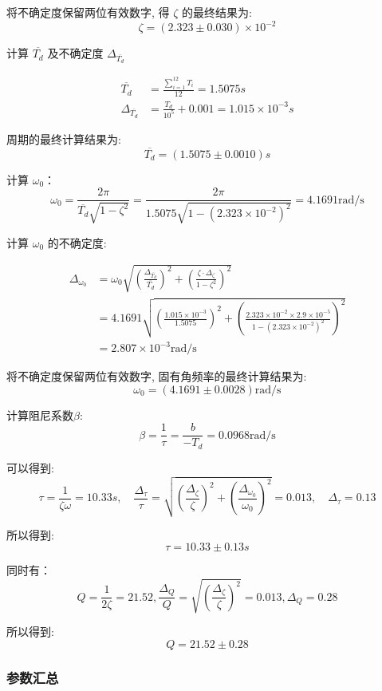 \documentclass[UTF8]{ctexart}
\begin{document}
将不确定度保留两位有效数字, 得  $\zeta $ 的最终结果为:
    $$
    \zeta=(2.323 \pm 0.030) \times 10^{-2}
    $$

计算 $ \overline{T_{d}} $ 及不确定度 $ \Delta_{\overline{T_{d}}} $

\begin{align}
\overline{T_{d}}&=\frac{\sum_{i=1}^{12} T_{i}}{12}=1.5075 s \nonumber\\
\Delta_{\overline{T_{d}}}&=\frac{T_{d}}{10^{5}}+0.001=1.015 \times 10^{-3} s\nonumber
\end{align}

周期的最终计算结果为:
$$
\overline{T_{d}}=(1.5075 \pm 0.0010) s
$$

计算  $\omega_{0} $：
$$
\omega_{0}=\frac{2 \pi}{\overline{T_{d}} \sqrt{1-\zeta^{2}}}=\frac{2 \pi}{1.5075 \sqrt{1-\left(2.323 \times 10^{-2}\right)^{2}}}=4.1691 \mathrm{rad} / \mathrm{s}
$$

计算  $\omega_{0} $ 的不确定度:

\begin{align}
\Delta_{\omega_{0}}&=\omega_{0} \sqrt{\left(\frac{\Delta_{\overline{T_{d}}}}{\overline{T_{d}}}\right)^{2}+\left(\frac{\zeta \cdot \Delta_{\zeta}}{1-\zeta^{2}}\right)^{2}} \nonumber \\
&=4.1691 \sqrt{\left(\frac{1.015 \times 10^{-3}}{1.5075}\right)^{2}+\left(\frac{2.323 \times 10^{-2} \times 2.9 \times 10^{-5}}{1-\left(2.323 \times 10^{-2}\right)^{2}}\right)^{2}} \nonumber\\
&=2.807 \times 10^{-3} \mathrm{rad} / \mathrm{s} \nonumber
\end{align}

将不确定度保留两位有效数字, 固有角频率的最终计算结果为:
$$
\omega_{0}=(4.1691 \pm 0.0028) \mathrm{rad} / \mathrm{s}
$$

计算阻尼系数$\beta$:
$$
\beta=\frac{1}{\tau}=\frac{b}{-T_{d}}=0.0968 \mathrm{rad} / \mathrm{s}
$$

可以得到:
$$
\tau=\frac{1}{\zeta \omega}=10.33 s, \quad \frac{\Delta_{\tau}}{\tau}=\sqrt{\left(\frac{\Delta_{\zeta}}{\zeta}\right)^{2}+\left(\frac{\Delta_{\omega_{0}}}{\omega_{0}}\right)^{2}}=0.013, \quad \Delta_{\tau}=0.13
$$

所以得到:
$$
\tau=10.33 \pm 0.13 s
$$

同时有：
$$
Q=\frac{1}{2 \zeta}=21.52, \frac{\Delta_{Q}}{Q}=\sqrt{\left(\frac{\Delta_{\zeta}}{\zeta}\right)^{2}}=0.013, \Delta_{Q}=0.28
$$

所以得到:
$$
Q=21.52 \pm 0.28
$$

\subsubsection{参数汇总}
\end{document}
